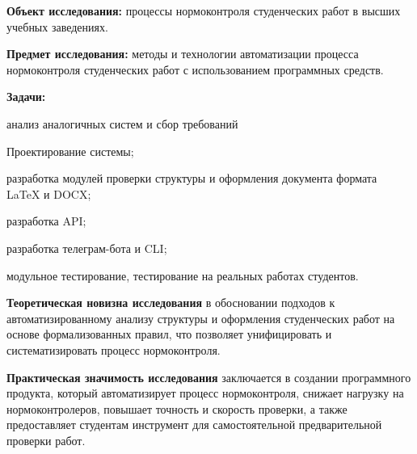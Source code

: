 \documentclass{report}
\begin{document}

{\bf Объект исследования:} процессы нормоконтроля студенческих работ в высших учебных заведениях.

{\bf Предмет исследования:} методы и технологии автоматизации процесса нормоконтроля студенческих работ с использованием программных средств.





\break
\break

{\bf Задачи:}
\begin{enumarabic}
\item анализ аналогичных систем и сбор требований
\item Проектирование системы;
\item разработка модулей проверки структуры и оформления документа формата LaTeX и DOCX;
\item разработка API;
\item разработка телеграм-бота и CLI;
\item модульное тестирование, тестирование на реальных работах студентов.
\end{enumarabic}

{\bf Теоретическая новизна исследования} в обосновании подходов к автоматизированному анализу структуры и оформления студенческих работ на основе формализованных правил, что позволяет унифицировать и систематизировать процесс нормоконтроля.

{\bf Практическая значимость исследования} заключается в создании программного продукта, который автоматизирует процесс нормоконтроля, снижает нагрузку на нормоконтролеров, повышает точность и скорость проверки, а также предоставляет студентам инструмент для самостоятельной предварительной проверки работ. 
\end{document}
